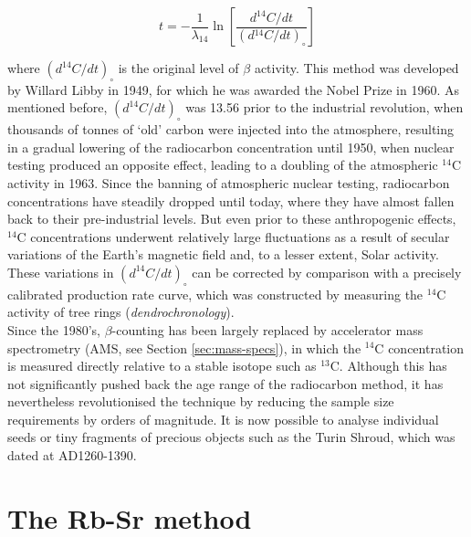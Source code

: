 \documentclass{book}
\begin{document}
\begin{equation}
t = -\frac{1}{\lambda_{14}}
\ln\left[\frac{d{}^{14}C/dt}{(d{}^{14}C/dt)_\circ}\right]
\label{eq:t14C}
\end{equation}

where $(d^{14}C/dt)_\circ$ is the original level of $\beta$ activity.
This method was developed by Willard Libby in 1949, for which he was
awarded the Nobel Prize in 1960. As mentioned before,
$(d^{14}C/dt)_\circ$ was 13.56 prior to the industrial revolution,
when thousands of tonnes of `old' carbon were injected into the
atmosphere, resulting in a gradual lowering of the radiocarbon
concentration until 1950, when nuclear testing produced an opposite
effect, leading to a doubling of the atmospheric $^{14}$C activity in
1963. Since the banning of atmospheric nuclear testing, radiocarbon
concentrations have steadily dropped until today, where they have
almost fallen back to their pre-industrial levels. But even prior to
these anthropogenic effects, $^{14}$C concentrations underwent
relatively large fluctuations as a result of secular variations of the
Earth's magnetic field and, to a lesser extent, Solar activity. These
variations in $(d^{14}C/dt)_\circ$ can be corrected by comparison with
a precisely calibrated production rate curve, which was constructed by
measuring the $^{14}$C activity of tree rings
(\emph{dendrochronology}).\\

Since the 1980's, $\beta$-counting has been largely replaced by
accelerator mass spectrometry (AMS, see Section \ref{sec:mass-specs}),
in which the $^{14}$C concentration is measured directly relative to a
stable isotope such as $^{13}$C. Although this has not significantly
pushed back the age range of the radiocarbon method, it has
nevertheless revolutionised the technique by reducing the sample size
requirements by orders of magnitude. It is now possible to analyse
individual seeds or tiny fragments of precious objects such as the
Turin Shroud, which was dated at AD1260-1390.

\section{The Rb-Sr method}
\label{sec:Rb-Sr}
\end{document}
